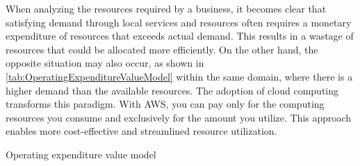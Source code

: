 When analyzing the resources required by a business, it becomes clear that satisfying demand through local services and resources often requires a monetary expenditure of resources that exceeds actual demand. This results in a wastage of resources that could be allocated more efficiently. On the other hand, the opposite situation may also occur, as shown in \ref{tab:OperatingExpenditureValueModel} within the same domain, where there is a higher demand than the available resources. The adoption of cloud computing transforms this paradigm. With AWS, you can pay only for the computing resources you consume and exclusively for the amount you utilize. This approach enables more cost-effective and streamlined resource utilization.
\begin{table}[h]
    \caption{Operating expenditure value model \cite{CloudComputing}}
    \label{tab:OperatingExpenditureValueModel}
\end{table}

